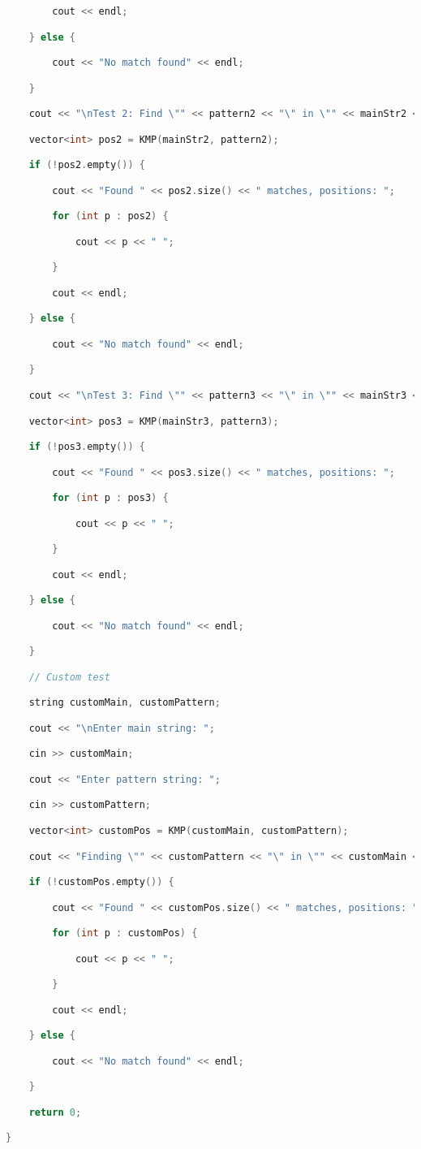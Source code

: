\begin{lstlisting}[language=C++]
        cout << endl;

    } else {

        cout << "No match found" << endl;

    }

    cout << "\nTest 2: Find \"" << pattern2 << "\" in \"" << mainStr2 << "\"" << endl;

    vector<int> pos2 = KMP(mainStr2, pattern2);

    if (!pos2.empty()) {

        cout << "Found " << pos2.size() << " matches, positions: ";

        for (int p : pos2) {

            cout << p << " ";

        }

        cout << endl;

    } else {

        cout << "No match found" << endl;

    }

    cout << "\nTest 3: Find \"" << pattern3 << "\" in \"" << mainStr3 << "\"" << endl;

    vector<int> pos3 = KMP(mainStr3, pattern3);

    if (!pos3.empty()) {

        cout << "Found " << pos3.size() << " matches, positions: ";

        for (int p : pos3) {

            cout << p << " ";

        }

        cout << endl;

    } else {

        cout << "No match found" << endl;

    }

    // Custom test

    string customMain, customPattern;

    cout << "\nEnter main string: ";

    cin >> customMain;

    cout << "Enter pattern string: ";

    cin >> customPattern;

    vector<int> customPos = KMP(customMain, customPattern);

    cout << "Finding \"" << customPattern << "\" in \"" << customMain << "\"" << endl;

    if (!customPos.empty()) {

        cout << "Found " << customPos.size() << " matches, positions: ";

        for (int p : customPos) {

            cout << p << " ";

        }

        cout << endl;

    } else {

        cout << "No match found" << endl;

    }

    return 0;

}
\end{lstlisting}
